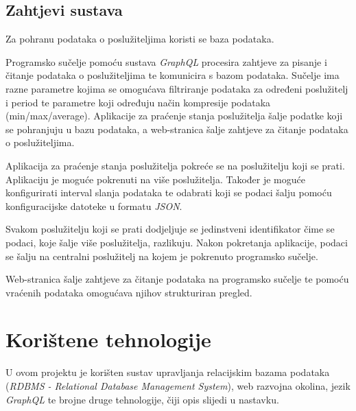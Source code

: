 \documentclass[zavrsnirad]{fer}
\begin{document}
\section{Zahtjevi sustava}
Za pohranu podataka o poslužiteljima koristi se baza podataka.

Programsko sučelje pomoću sustava \textit{GraphQL} procesira zahtjeve za pisanje i čitanje podataka o poslužiteljima te komunicira s bazom podataka. Sučelje ima razne parametre kojima se omogućava filtriranje podataka za određeni poslužitelj i period te parametre koji određuju način kompresije podataka (min/max/average). Aplikacije za praćenje stanja poslužitelja šalje podatke koji se pohranjuju  u bazu podataka, a web-stranica šalje zahtjeve za čitanje podataka o poslužiteljima.

Aplikacija za praćenje stanja poslužitelja pokreće se na poslužitelju koji se prati. Aplikaciju je moguće pokrenuti na više poslužitelja. Također je moguće konfigurirati interval slanja podataka te odabrati koji se podaci šalju pomoću konfiguracijske datoteke u formatu \textit{JSON}.

Svakom poslužitelju koji se prati dodjeljuje se jedinstveni identifikator čime se podaci, koje šalje više poslužitelja, razlikuju. Nakon pokretanja aplikacije, podaci se šalju na centralni poslužitelj na kojem je pokrenuto programsko sučelje.

Web-stranica šalje zahtjeve za čitanje podataka na programsko sučelje te pomoću vraćenih podataka omogućava njihov strukturiran pregled.

\chapter{Korištene tehnologije}
\label{pog:koristene_tehnologije}
U ovom projektu je korišten sustav upravljanja relacijskim bazama podataka (\textit{RDBMS - Relational Database Management System}), web razvojna okolina, jezik \textit{GraphQL} te brojne druge tehnologije, čiji opis slijedi u nastavku.
\end{document}
